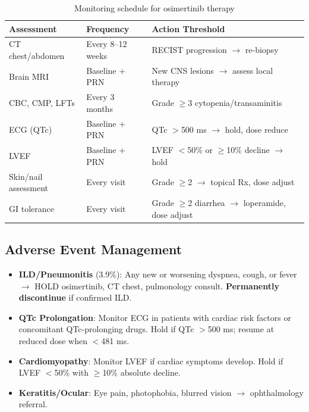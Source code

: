 \documentclass[10pt,letterpaper]{article}
\begin{document}
\begin{table}[H]
\centering
\small
\begin{tabular}{p{3.5cm}p{3cm}p{5cm}}
\toprule
\textbf{Assessment} & \textbf{Frequency} & \textbf{Action Threshold} \\
\midrule
CT chest/abdomen & Every 8--12 weeks & RECIST progression $\rightarrow$ re-biopsy \\
Brain MRI & Baseline + PRN & New CNS lesions $\rightarrow$ assess local therapy \\
CBC, CMP, LFTs & Every 3 months & Grade $\geq$3 cytopenia/transaminitis \\
ECG (QTc) & Baseline + PRN & QTc $>$500 ms $\rightarrow$ hold, dose reduce \\
LVEF & Baseline + PRN & LVEF $<$50\% or $\geq$10\% decline $\rightarrow$ hold \\
Skin/nail assessment & Every visit & Grade $\geq$2 $\rightarrow$ topical Rx, dose adjust \\
GI tolerance & Every visit & Grade $\geq$2 diarrhea $\rightarrow$ loperamide, dose adjust \\
\bottomrule
\end{tabular}
\caption{Monitoring schedule for osimertinib therapy}
\end{table}

\subsection{Adverse Event Management}

\begin{tcolorbox}[enhanced,colback=warningred!5,colframe=warningred,
title={\textbf{Critical Safety Alerts}},
fonttitle=\bfseries\small,coltitle=black]
{\small
\begin{itemize}
\item \textbf{ILD/Pneumonitis} (3.9\%): Any new or worsening dyspnea, cough, or fever $\rightarrow$ HOLD osimertinib, CT chest, pulmonology consult. \textbf{Permanently discontinue} if confirmed ILD.
\item \textbf{QTc Prolongation}: Monitor ECG in patients with cardiac risk factors or concomitant QTc-prolonging drugs. Hold if QTc $>$500 ms; resume at reduced dose when $<$481 ms.
\item \textbf{Cardiomyopathy}: Monitor LVEF if cardiac symptoms develop. Hold if LVEF $<$50\% with $\geq$10\% absolute decline.
\item \textbf{Keratitis/Ocular}: Eye pain, photophobia, blurred vision $\rightarrow$ ophthalmology referral.
\end{itemize}
}
\end{tcolorbox}
\end{document}
